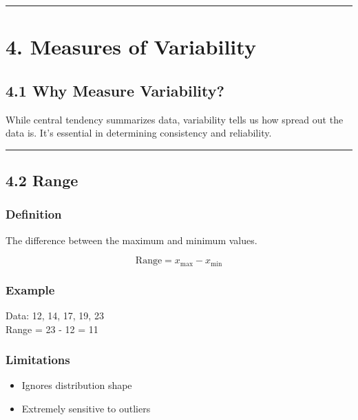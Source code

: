 \documentclass[
  letterpaper,
  DIV=11,
  numbers=noendperiod]{scrreprt}
\providecommand{\tightlist}{%
  \setlength{\itemsep}{0pt}\setlength{\parskip}{0pt}}
\begin{document}
\begin{center}\rule{0.5\linewidth}{0.5pt}\end{center}

\section{4. Measures of Variability}\label{measures-of-variability}

\subsection{4.1 Why Measure Variability?}\label{why-measure-variability}

While central tendency summarizes data, variability tells us how spread
out the data is. It's essential in determining consistency and
reliability.

\begin{center}\rule{0.5\linewidth}{0.5pt}\end{center}

\subsection{4.2 Range}\label{range}

\subsubsection{Definition}\label{definition-3}

The difference between the maximum and minimum values.

\[
\text{Range} = x_{\text{max}} - x_{\text{min}}
\]

\subsubsection{Example}\label{example-3}

Data: 12, 14, 17, 19, 23\\
Range = 23 - 12 = 11

\subsubsection{Limitations}\label{limitations}

\begin{itemize}
\tightlist
\item
  Ignores distribution shape
\item
  Extremely sensitive to outliers
\end{itemize}
\end{document}
